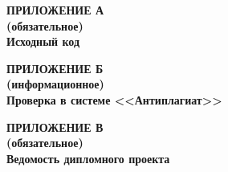 \begin{center}
\textbf{
\MakeUppercase{Приложение А}\\
(обязательное)\\
Исходный код}
\end{center}



\newpage

\begin{center}
\textbf{
\MakeUppercase{Приложение Б}\\
(информационное)\\
Проверка в системе <<Антиплагиат>>}
\end{center}

\newpage


\newpage


\begin{center}
\textbf{
\MakeUppercase{Приложение В}\\
(обязательное)\\
Ведомость дипломного проекта}
\end{center}

\newpage
\pagestyle{empty}

\pagestyle{fancy}